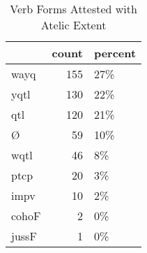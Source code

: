 \begin{table}[htbp!]
\centering
\caption{Verb Forms Attested with Atelic Extent}
\label{table:atelext_verb_cp}
\begin{tabular}{lrl}
\toprule
{} &  count & percent \\
\midrule
wayq  &    155 &     27\% \\
yqtl  &    130 &     22\% \\
qtl   &    120 &     21\% \\
Ø     &     59 &     10\% \\
wqtl  &     46 &      8\% \\
ptcp  &     20 &      3\% \\
impv  &     10 &      2\% \\
cohoF &      2 &      0\% \\
jussF &      1 &      0\% \\
\bottomrule
\end{tabular}
\end{table}
